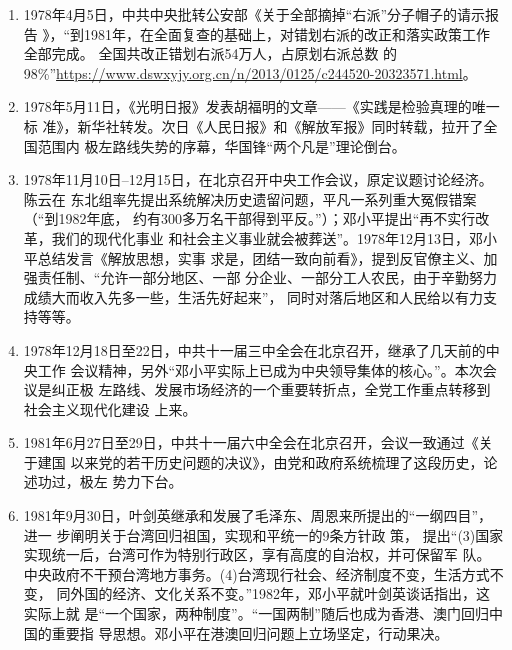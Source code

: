 \begin{enumerate}
\item 1978年4月5日，中共中央批转公安部《关于全部摘掉“右派”分子帽子的请示报告
  》，“到1981年，在全面复查的基础上，对错划右派的改正和落实政策工作全部完成。
  全国共改正错划右派54万人，占原划右派总数
  的98\%”\url{https://www.dswxyjy.org.cn/n/2013/0125/c244520-20323571.html}。

\item 1978年5月11日，《光明日报》发表胡福明的文章——《实践是检验真理的唯一标
  准》，新华社转发。次日《人民日报》和《解放军报》同时转载，拉开了全国范围内
  极左路线失势的序幕，华国锋“两个凡是”理论倒台。


\item 1978年11月10日--12月15日，在北京召开中央工作会议，原定议题讨论经济。陈云在
  东北组率先提出系统解决历史遗留问题，平凡一系列重大冤假错案（“到1982年底，
  约有300多万名干部得到平反。”）；邓小平提出“再不实行改革，我们的现代化事业
  和社会主义事业就会被葬送”。1978年12月13日，邓小平总结发言《解放思想，实事
  求是，团结一致向前看》，提到反官僚主义、加强责任制、“允许一部分地区、一部
  分企业、一部分工人农民，由于辛勤努力成绩大而收入先多一些，生活先好起来”，
  同时对落后地区和人民给以有力支持等等。

\item 1978年12月18日至22日，中共十一届三中全会在北京召开，继承了几天前的中央工作
  会议精神，另外“邓小平实际上已成为中央领导集体的核心。”。本次会议是纠正极
  左路线、发展市场经济的一个重要转折点，全党工作重点转移到社会主义现代化建设
  上来。

\item 1981年6月27日至29日，中共十一届六中全会在北京召开，会议一致通过《关于建国
  以来党的若干历史问题的决议》，由党和政府系统梳理了这段历史，论述功过，极左
  势力下台。

\item 1981年9月30日，叶剑英继承和发展了毛泽东、周恩来所提出的“一纲四目”，进一
  步阐明关于台湾回归祖国，实现和平统一的9条方针政
  策， 提出“(3)国家实现统一后，台湾可作为特别行政区，享有高度的自治权，并可保留军
  队。中央政府不干预台湾地方事务。(4)台湾现行社会、经济制度不变，生活方式不变，
  同外国的经济、文化关系不变。”1982年，邓小平就叶剑英谈话指出，这实际上就
  是“一个国家，两种制度”。“一国两制”随后也成为香港、澳门回归中国的重要指
  导思想。邓小平在港澳回归问题上立场坚定，行动果决。


\end{enumerate}
